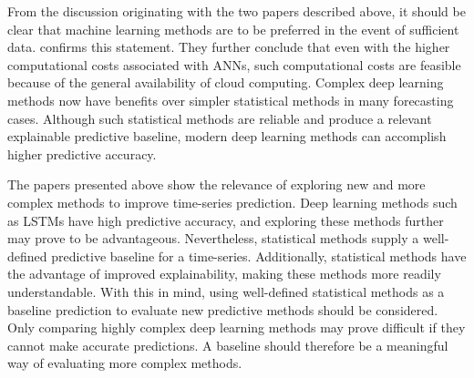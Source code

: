 From the discussion originating with the two papers described above,
it should be clear that machine learning methods are to be preferred in the event of sufficient data.
\cite{Hewamalage2021} confirms this statement. They further conclude that even with the higher computational costs
associated with ANNs, such computational costs are feasible because of the general availability of cloud computing.
Complex deep learning methods now have benefits over simpler statistical methods in many forecasting cases.
Although such statistical methods are reliable and produce a relevant explainable predictive baseline,
modern deep learning methods can accomplish higher predictive accuracy.

The papers presented above show the relevance of exploring new and more complex methods to improve time-series prediction.
Deep learning methods such as LSTMs have high predictive accuracy,
and exploring these methods further may prove to be advantageous.
Nevertheless, statistical methods supply a well-defined predictive baseline for a time-series.
Additionally, statistical methods have the advantage of improved explainability,
making these methods more readily understandable.
With this in mind, using well-defined statistical methods as a baseline prediction to evaluate new predictive methods should be considered.
Only comparing highly complex deep learning methods may prove difficult if they cannot make accurate predictions.
A baseline should therefore be a meaningful way of evaluating more complex methods.


